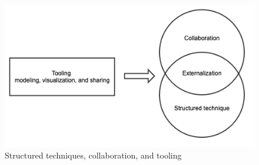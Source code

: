 \begin{figure}
	\centering
	\includegraphics[width=\columnwidth]{06-Discussion/img/theory.png}
	\caption{Structured techniques, collaboration, and tooling}
\end{figure}

